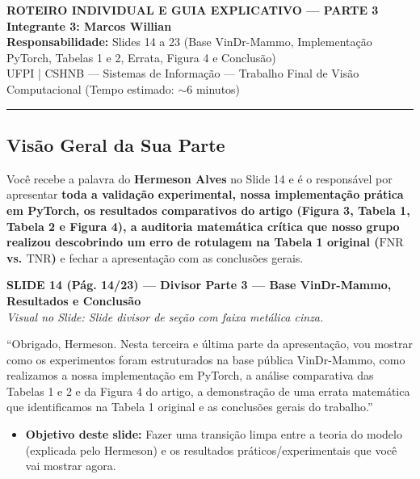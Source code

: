 \documentclass[11pt,a4paper]{article}
\newcommand{\slideheader}[3]{%
    \vspace{10pt}%
    \begin{tcolorbox}[colback=slateborder, colframe=slateborder, coltext=white, boxrule=0pt, arc=3pt, left=8pt, right=8pt, top=5pt, bottom=5pt]
        {\large\bfseries #1 — #2}\\[2pt]
        {\small\itshape Visual no Slide: #3}
    \end{tcolorbox}%
}
\newenvironment{falabox}{%
    \begin{tcolorbox}[colback=speechbg, colframe=speechborder, boxrule=1.2pt, arc=4pt, left=10pt, right=10pt, top=8pt, bottom=8pt, title={\bfseries O QUE VOCÊ DEVE FALAR (Fala Sugerida)}]%
}{%
    \end{tcolorbox}%
}
\newenvironment{explicabox}{%
    \begin{tcolorbox}[colback=explainbg, colframe=explainborder, boxrule=0.8pt, arc=4pt, left=10pt, right=10pt, top=8pt, bottom=8pt, title={\bfseries ENTENDA O QUE VOCÊ ESTÁ FALANDO (Explicação Didática de Cada Termo)}]%
}{%
    \end{tcolorbox}%
}
\begin{document}
\begin{center}
    {\LARGE\bfseries ROTEIRO INDIVIDUAL E GUIA EXPLICATIVO — PARTE 3}\\[6pt]
    {\Large\bfseries Integrante 3: Marcos Willian}\\[4pt]
    {\normalsize\textbf{Responsabilidade:} Slides 14 a 23 (Base VinDr-Mammo, Implementação PyTorch, Tabelas 1 e 2, Errata, Figura 4 e Conclusão)}\\
    {\small UFPI | CSHNB — Sistemas de Informação — Trabalho Final de Visão Computacional (Tempo estimado: $\sim$6 minutos)}
\end{center}
\hrule
\vspace{6pt}

\subsection*{Visão Geral da Sua Parte}
Você recebe a palavra do \textbf{Hermeson Alves} no Slide 14 e é o responsável por apresentar \textbf{toda a validação experimental, nossa implementação prática em PyTorch, os resultados comparativos do artigo (Figura 3, Tabela 1, Tabela 2 e Figura 4), a auditoria matemática crítica que nosso grupo realizou descobrindo um erro de rotulagem na Tabela 1 original ($\text{FNR}$ vs. $\text{TNR}$)} e fechar a apresentação com as conclusões gerais.

\slideheader{SLIDE 14 (Pág. 14/23)}{Divisor Parte 3 — Base VinDr-Mammo, Resultados e Conclusão}{Slide divisor de seção com faixa metálica cinza.}

\begin{falabox}
``Obrigado, Hermeson. Nesta terceira e última parte da apresentação, vou mostrar como os experimentos foram estruturados na base pública VinDr-Mammo, como realizamos a nossa implementação em PyTorch, a análise comparativa das Tabelas 1 e 2 e da Figura 4 do artigo, a demonstração de uma errata matemática que identificamos na Tabela 1 original e as conclusões gerais do trabalho.''
\end{falabox}

\begin{explicabox}
\begin{itemize}[leftmargin=*, itemsep=4pt]
    \item \textbf{Objetivo deste slide:} Fazer uma transição limpa entre a teoria do modelo (explicada pelo Hermeson) e os resultados práticos/experimentais que você vai mostrar agora.
\end{itemize}
\end{explicabox}
\end{document}
